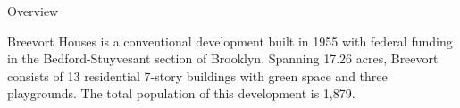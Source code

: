 Overview

Breevort Houses is a conventional development built in 1955 with federal funding in the Bedford-Stuyvesant section of Brooklyn. Spanning 17.26 acres, Breevort consists of 13 residential 7-story buildings with green space and three playgrounds. The total population of this development is 1,879.